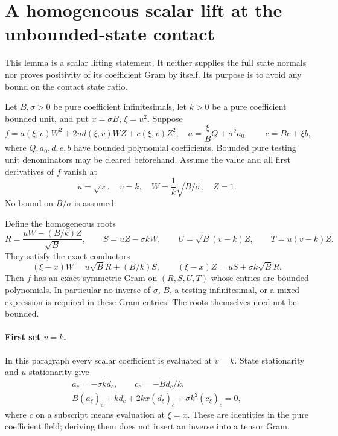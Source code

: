 \section[A homogeneous scalar lift at the unbounded-state contact]{A homogeneous scalar lift at the unbounded-state contact}
\label{sec:unbounded-b-homogeneous-scalar}

This lemma is a scalar lifting statement.  It neither supplies the full
state normals nor proves positivity of its coefficient Gram by itself.
Its purpose is to avoid any bound on the contact state ratio.

Let $B,\sigma>0$ be pure coefficient infinitesimals, let $k>0$ be a
pure coefficient bounded unit, and put $x=\sigma B$, $\xi=u^2$.
Suppose
\[
 f=a(\xi,v)W^2+2u d(\xi,v)WZ+c(\xi,v)Z^2,
 \quad
 a=\frac\xi B Q+\sigma^2 a_0,\qquad
 c=B e+\xi b,                                      \tag{HL1}
\]
where $Q,a_0,d,e,b$ have bounded polynomial coefficients.  Bounded
pure testing unit denominators may be cleared beforehand.
Assume the value and all first derivatives of $f$ vanish at
\[
 u=\sqrt{x},\quad v=k,\quad
 W=\frac1k\sqrt{B/\sigma},\quad Z=1.                \tag{HL2}
\]
No bound on $B/\sigma$ is assumed.

Define the homogeneous roots
\[
 R=\frac{uW-(B/k)Z}{\sqrt B},\qquad
 S=uZ-\sigma kW,\qquad
 U=\sqrt B(v-k)Z,\qquad T=u(v-k)Z.                 \tag{HL3}
\]
They satisfy the exact conductors
\[
 (\xi-x)W=u\sqrt B R+(B/k)S,
 \qquad
 (\xi-x)Z=uS+\sigma k\sqrt B R.                    \tag{HL4}
\]
Then $f$ has an exact symmetric Gram on $(R,S,U,T)$ whose entries
are bounded polynomials.  In particular no inverse of $\sigma$,
$B$, a testing infinitesimal, or a mixed expression is required in
these Gram entries.  The roots themselves need not be bounded.

\paragraph{First set $v=k$.}
In this paragraph every scalar coefficient is evaluated at $v=k$.
State stationarity and $u$ stationarity give
\begin{gather*}
 a_c=-\sigma k d_c,\qquad c_c=-B d_c/k,\\
 B(a_\xi)_c+kd_c+2kx(d_\xi)_c
                      +\sigma k^2(c_\xi)_c=0,     \tag{HL5}
\end{gather*}
where $c$ on a subscript means evaluation at $\xi=x$.
These are identities in the pure coefficient field; deriving them
does not insert an inverse into a tensor Gram.

